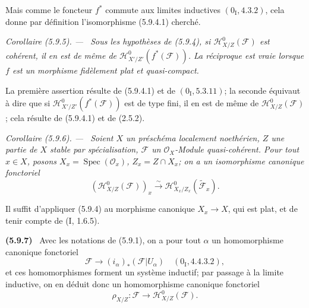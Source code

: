 \documentclass[10pt,oneside]{book}
\newcommand{\oldpage}[2][]{%
  \setcounter{footnote}{0}%
  \marginpar{\scriptsize\textbf{#1}~|~#2}\ignorespaces}
\newenvironment{env}[1][]{\par\medskip\noindent\textbf{(#1)}\ }{\par}
\newenvironment{corollary}[1][]{%
  \par\medskip\noindent\itshape Corollaire (#1). ---\ }{\par}
\begin{document}
\oldpage[IV-2]{111}

Mais comme le foncteur $f^*$ commute aux limites inductives
$(0_{\mathrm I},4.3.2)$, cela donne par définition l'isomorphisme
(5.9.4.1) cherché.

\begin{corollary}[5.9.5]
\label{IV.2.s5.9.5-fr}
Sous les hypothèses de (5.9.4), si
$\mathcal H^0_{X/Z}(\mathcal F)$ est cohérent, il en est de même de
$\mathcal H^0_{X'/Z'}(f^*(\mathcal F))$. La réciproque est vraie lorsque
$f$ est un morphisme fidèlement plat et quasi-compact.
\end{corollary}

La première assertion résulte de (5.9.4.1) et de $(0_{\mathrm I},5.3.11)$;
la seconde équivaut à dire que si
$\mathcal H^0_{X'/Z'}(f^*(\mathcal F))$ est de type fini, il en est de même
de $\mathcal H^0_{X/Z}(\mathcal F)$; cela résulte de (5.9.4.1) et de
(2.5.2).

\begin{corollary}[5.9.6]
\label{IV.2.s5.9.6-fr}
Soient $X$ un préschéma localement noethérien, $Z$ une partie de $X$ stable
par spécialisation, $\mathcal F$ un $\mathcal O_X$-Module quasi-cohérent.
Pour tout $x\in X$, posons $X_x=\operatorname{Spec}(\mathcal O_x)$,
$Z_x=Z\cap X_x$; on a un isomorphisme canonique fonctoriel
\begin{equation}
(\mathcal H^0_{X/Z}(\mathcal F))_x
\xrightarrow{\sim}\mathcal H^0_{X_x/Z_x}(\widetilde{\mathcal F}_x).
\tag{5.9.6.1}\label{IV.2.s5.9.6.1-fr}
\end{equation}
\end{corollary}

Il suffit d'appliquer (5.9.4) au morphisme canonique $X_x\to X$, qui est
plat, et de tenir compte de (I, 1.6.5).

\begin{env}[5.9.7]
\label{IV.2.s5.9.7-fr}
Avec les notations de (5.9.1), on a pour tout $\alpha$ un homomorphisme
canonique fonctoriel
\[
\mathcal F\longrightarrow(i_\alpha)_*(\mathcal F|U_\alpha)
\quad(0_{\mathrm I},4.4.3.2),
\]
et ces homomorphismes forment un système inductif; par passage à la limite
inductive, on en déduit donc un homomorphisme canonique fonctoriel
\begin{equation}
\rho_{X/Z}:\mathcal F\longrightarrow\mathcal H^0_{X/Z}(\mathcal F).
\tag{5.9.7.1}\label{IV.2.s5.9.7.1-fr}
\end{equation}
\end{env}
\end{document}
